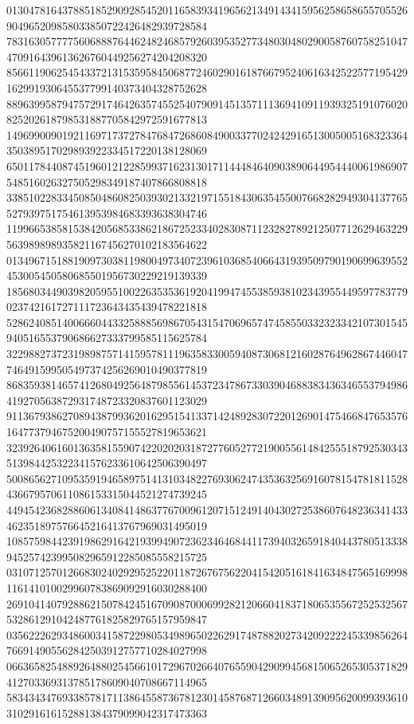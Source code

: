 \begin{DoxyCode}
      013047816437885185290928545201165839341965621349143415956258658655705526904965209858033850722426482939728584
      783163057777560688876446248246857926039535277348030480290058760758251047470916439613626760449256274204208320
      856611906254543372131535958450687724602901618766795240616342522577195429162991930645537799140373404328752628
      889639958794757291746426357455254079091451357111369410911939325191076020825202618798531887705842972591677813
      149699009019211697173727847684726860849003377024242916513005005168323364350389517029893922334517220138128069
      650117844087451960121228599371623130171144484640903890644954440061986907548516026327505298349187407866808818
      338510228334508504860825039302133219715518430635455007668282949304137765527939751754613953984683393638304746
      119966538581538420568533862186725233402830871123282789212507712629463229563989898935821167456270102183564622
      013496715188190973038119800497340723961036854066431939509790190699639552453005450580685501956730229219139339
      185680344903982059551002263535361920419947455385938102343955449597783779023742161727111723643435439478221818
      528624085140066604433258885698670543154706965747458550332323342107301545940516553790686627333799585115625784
      322988273723198987571415957811196358330059408730681216028764962867446047746491599505497374256269010490377819
      868359381465741268049256487985561453723478673303904688383436346553794986419270563872931748723320837601123029
      911367938627089438799362016295154133714248928307220126901475466847653576164773794675200490757155527819653621
      323926406160136358155907422020203187277605277219005561484255518792530343513984425322341576233610642506390497
      500865627109535919465897514131034822769306247435363256916078154781811528436679570611086153315044521274739245
      449454236828860613408414863776700961207151249140430272538607648236341433462351897576645216413767969031495019
      108575984423919862916421939949072362346468441173940326591840443780513338945257423995082965912285085558215725
      031071257012668302402929525220118726767562204154205161841634847565169998116141010029960783869092916030288400
      269104140792886215078424516709087000699282120660418371806535567252532567532861291042487761825829765157959847
      035622262934860034158722980534989650226291748788202734209222245339856264766914905562842503912757710284027998
      066365825488926488025456610172967026640765590429099456815065265305371829412703369313785178609040708667114965
      583434347693385781711386455873678123014587687126603489139095620099393610310291616152881384379099042317473363

\end{DoxyCode}
